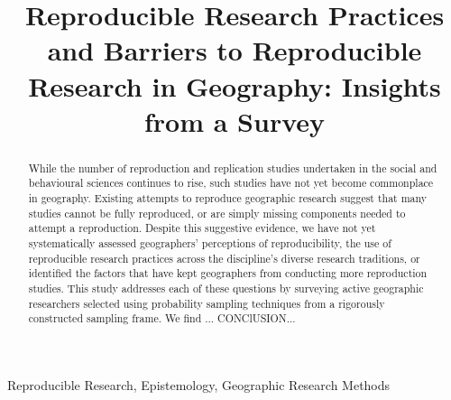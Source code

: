 \documentclass[]{interact}
\theoremstyle{plain}%
\theoremstyle{definition}
\theoremstyle{remark}
\begin{document}

\title{Reproducible Research Practices and Barriers to Reproducible Research in Geography: Insights from a Survey}

\author{
}

\maketitle

\begin{abstract}
While the number of reproduction and replication studies undertaken in the social and behavioural sciences continues to rise, such studies have not yet become commonplace in geography. 
Existing attempts to reproduce geographic research suggest that many studies cannot be fully reproduced, or are simply missing components needed to attempt a reproduction. 
Despite this suggestive evidence, we have not yet systematically assessed geographers' perceptions of reproducibility, the use of reproducible research practices across the discipline's diverse research traditions, or identified the factors that have kept geographers from conducting more reproduction studies.
This study addresses each of these questions by surveying active geographic researchers selected using probability sampling techniques from a rigorously constructed sampling frame.
We find ...
CONClUSION...

\end{abstract}

\begin{keywords}
Reproducible Research, Epistemology, Geographic Research Methods
\end{keywords}

\end{document}
